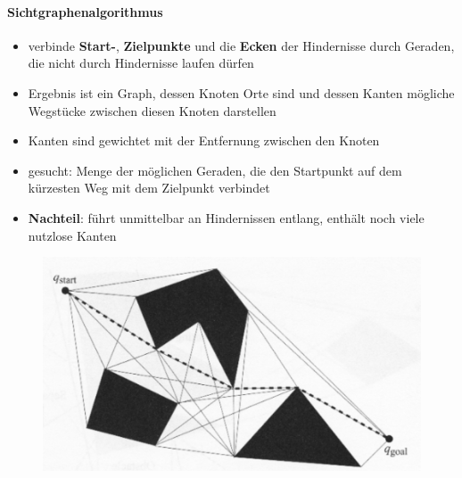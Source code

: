 \paragraph{Sichtgraphenalgorithmus}
\begin{itemize}
	\item verbinde \textbf{Start-}, \textbf{Zielpunkte} und die \textbf{Ecken} der Hindernisse durch Geraden, die nicht durch Hindernisse laufen dürfen
	\item Ergebnis ist ein Graph, dessen Knoten Orte sind und dessen Kanten mögliche Wegstücke zwischen diesen Knoten darstellen
	\item Kanten sind gewichtet mit der Entfernung zwischen den Knoten
	\item gesucht: Menge der möglichen Geraden, die den Startpunkt auf dem kürzesten Weg mit dem Zielpunkt verbindet
	\item \textbf{Nachteil}: führt unmittelbar an Hindernissen entlang, enthält noch viele nutzlose Kanten
\end{itemize}
\begin{figure}[H]
	\begin{center}
		\includegraphics[scale=0.5]{Resources/PNG/Sichtgraphalgorithmus.PNG}
		\caption{}
		\label{fig:PNG/Sichtgraphalgorithmus.PNG}
	\end{center}
\end{figure}
\newpage
